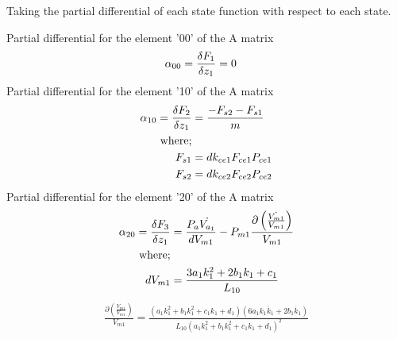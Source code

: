 \documentclass[11pt,a4paper]{article}
\begin{document}
\begin{appendices}
Taking the partial differential of each state function with respect to each state.\newline

Partial differential for the element '00' of the A matrix\newline
\begin{align}
    \alpha_{00} = \fdv{F_1}{z_1} &= 0
\end{align}
Partial differential for the element '10' of the A matrix\newline
\begin{align}
    \alpha_{10} = \fdv{F_2}{z_1} &= \frac{-F_{s2} - F_{s1}}{m}
    \label{math:alpha_10_matrix}\\
    \text{where;}\nonumber\\
    F_{s1} &= dk_{ce1} F_{ce1} P_{ce1}\nonumber\\
    F_{s2} &= dk_{ce2} F_{ce2} P_{ce2}\nonumber
\end{align}
Partial differential for the element '20' of the A matrix\newline
\begin{align}
    \alpha_{20} = \fdv{F_3}{z_1} &= \frac{P_a \dot{V_{a_1}}}{dV_{m1}} - P_{m1} \frac{\partial \left(\frac{\dot{V_{m1}}}{V_{m1}}\right)}{V_{m1}}
    \label{math:alpha_20_matrix}\\
    \text{where;}\nonumber\\
    dV_{m1}          &= \frac{3 a_1 k_{1}^2 + 2 b_1 k_{1} + c_1}{L_{10}}\nonumber
\end{align}
\begin{multline*}
    \frac{\partial \left(\frac{\dot{V_{m1}}}{V_{m1}}\right)}{V_{m1}} =
        \frac{(a_1 k_{1}^2 + b_1 k_{1}^2 + c_1 k_{1} + d_1) 
                (6 a_1 k_{1} \dot{k_{1}} + 2 b_1 \dot{k_{1}})}
            {L_{10} (a_1 k_{1}^2 + b_1 k_{1}^2 + c_1 k_{1} + d_1)^2}\\

\end{multline*}
\end{appendices}
\end{document}

